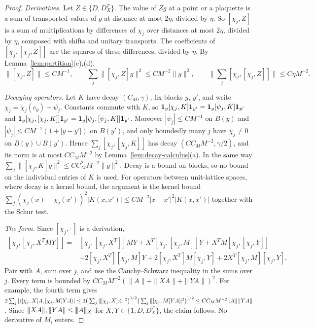 \begin{proof}
\emph{Derivatives.} Let $Z\in\{D,D^T_X\}$. The value of $Zg$ at a point or a plaquette is a sum of transported values of $g$ at distance at most $2\eta$, divided by $\eta$. So $[\chi_j,Z]$ is a sum of multiplications by differences of $\chi_j$ over distances at most $2\eta$, divided by $\eta$, composed with shifts and unitary transports. The coefficients of $[\chi_j,[\chi_j,Z]]$ are the squares of these differences, divided by $\eta$. By Lemma~\ref{lem:partition}(c),(d),
\[
\|[\chi_j,Z]\|\le CM^{-1},\qquad\sum_j\|[\chi_j,Z]g\|^2\le CM^{-2}\|g\|^2,\qquad\Big\|\sum_j[\chi_j,[\chi_j,Z]]\Big\|\le C\eta M^{-2}.
\]

\emph{Decaying operators.} Let $K$ have decay $(C_M,\gamma)$, fix blocks $y$, $y'$, and write $\chi_j=\chi_j(c_y)+\psi_j$. Constants commute with $K$, so $\mathbf 1_y[\chi_j,K]\mathbf 1_{y'}=\mathbf 1_y[\psi_j,K]\mathbf 1_{y'}$ and $\mathbf 1_y[\chi_j,[\chi_j,K]]\mathbf 1_{y'}=\mathbf 1_y[\psi_j,[\psi_j,K]]\mathbf 1_{y'}$. Moreover $|\psi_j|\le CM^{-1}$ on $B(y)$ and $|\psi_j|\le CM^{-1}(1+|y-y'|)$ on $B(y')$, and only boundedly many $j$ have $\chi_j\ne0$ on $B(y)\cup B(y')$. Hence $\sum_j[\chi_j,[\chi_j,K]]$ has decay $(CC_MM^{-2},\gamma/2)$, and its norm is at most $CC_MM^{-2}$ by Lemma~\ref{lem:decay-calculus}(a). In the same way $\sum_j\|[\chi_j,K]g\|^2\le CC_M^2M^{-2}\|g\|^2$. Decay is a bound on blocks, so no bound on the individual entries of $K$ is used. For operators between unit-lattice spaces, where decay is a kernel bound, the argument is the kernel bound $\sum_j(\chi_j(x)-\chi_j(x'))^2|K(x,x')|\le CM^{-2}|x-x'|^2|K(x,x')|$ together with the Schur test.

\emph{The form.} Since $[\chi_j,\cdot\,]$ is a derivation,
\[
\begin{aligned}
{}[\chi_j,[\chi_j,X^TMY]]={}&[\chi_j,[\chi_j,X^T]]MY+X^T[\chi_j,[\chi_j,M]]Y+X^TM[\chi_j,[\chi_j,Y]]\\
&+2[\chi_j,X^T][\chi_j,M]Y+2[\chi_j,X^T]M[\chi_j,Y]+2X^T[\chi_j,M][\chi_j,Y].
\end{aligned}
\]
Pair with $A$, sum over $j$, and use the Cauchy--Schwarz inequality in the sums over $j$. Every term is bounded by $CC_MM^{-2}(\|A\|+\|XA\|+\|YA\|)^2$. For example, the fourth term gives $2\sum_j|\langle [\chi_j,X]A,[\chi_j,M]YA\rangle|\le2\big(\sum_j\|[\chi_j,X]A\|^2\big)^{1/2}\big(\sum_j\|[\chi_j,M]YA\|^2\big)^{1/2}\le CC_MM^{-2}\|A\|\,\|YA\|$. Since $\|XA\|,\|YA\|\le|\!|\!|A|\!|\!|_X$ for $X,Y\in\{1,D,D^T_X\}$, the claim follows. No derivative of $M_i$ enters.
\end{proof}

